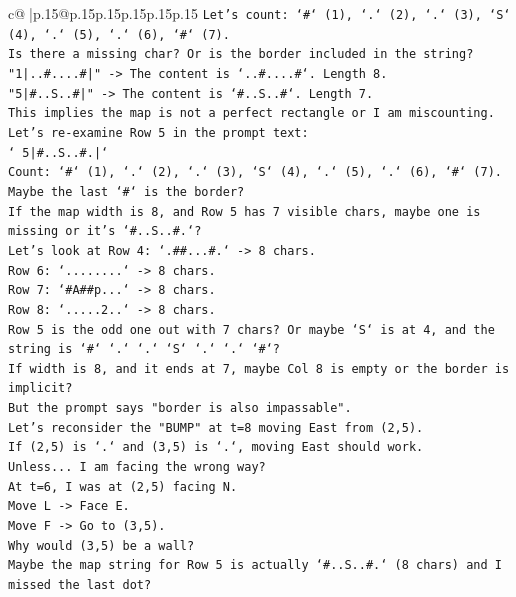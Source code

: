 \documentclass{article}
\begin{document}
{\begin{supertabular}{c@{$\;$}|p{.15\linewidth}@{}p{.15\linewidth}p{.15\linewidth}p{.15\linewidth}p{.15\linewidth}p{.15\linewidth}}
{{{\texttt{Let's count: `\#` (1), `.` (2), `.` (3), `S` (4), `.` (5), `.` (6), `\#` (7).} \\
\texttt{Is there a missing char? Or is the border included in the string?} \\
\texttt{"1|..\#....\#|" {-}> The content is `..\#....\#`. Length 8.} \\
\texttt{"5|\#..S..\#|" {-}> The content is `\#..S..\#`. Length 7.} \\
\texttt{This implies the map is not a perfect rectangle or I am miscounting.} \\
\texttt{Let's re{-}examine Row 5 in the prompt text:} \\
\texttt{` 5|\#..S..\#.|`} \\
\texttt{Count: `\#` (1), `.` (2), `.` (3), `S` (4), `.` (5), `.` (6), `\#` (7).} \\
\texttt{Maybe the last `\#` is the border?} \\
\texttt{If the map width is 8, and Row 5 has 7 visible chars, maybe one is missing or it's `\#..S..\#.`?} \\
\texttt{Let's look at Row 4: `.\#\#...\#.` {-}> 8 chars.} \\
\texttt{Row 6: `........` {-}> 8 chars.} \\
\texttt{Row 7: `\#A\#\#p...` {-}> 8 chars.} \\
\texttt{Row 8: `.....2..` {-}> 8 chars.} \\
\texttt{Row 5 is the odd one out with 7 chars? Or maybe `S` is at 4, and the string is `\#` `.` `.` `S` `.` `.` `\#`?} \\
\texttt{If width is 8, and it ends at 7, maybe Col 8 is empty or the border is implicit?} \\
\texttt{But the prompt says "border is also impassable".} \\
\texttt{Let's reconsider the "BUMP" at t=8 moving East from (2,5).} \\
\texttt{If (2,5) is `.` and (3,5) is `.`, moving East should work.} \\
\texttt{Unless... I am facing the wrong way?} \\
\texttt{At t=6, I was at (2,5) facing N.} \\
\texttt{Move L {-}> Face E.} \\
\texttt{Move F {-}> Go to (3,5).} \\
\texttt{Why would (3,5) be a wall?} \\
\texttt{Maybe the map string for Row 5 is actually `\#..S..\#.` (8 chars) and I missed the last dot?} \\
}}}
\end{supertabular}}
\end{document}
